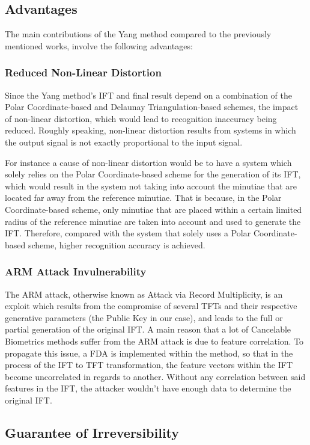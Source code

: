 \documentclass[fyp]{socreport}
\begin{document}
\subsection{Advantages}
The main contributions of the Yang method compared to the previously mentioned works, involve the following advantages:

\subsubsection{Reduced Non-Linear Distortion}
Since the Yang method's IFT and final result depend on a combination of the Polar Coordinate-based and Delaunay Triangulation-based schemes, the impact of non-linear distortion, which would lead to recognition inaccuracy being reduced. Roughly speaking, non-linear distortion results from systems in which the output signal is not exactly proportional to the input signal. 

For instance a cause of non-linear distortion would be to have a system which solely relies on the Polar Coordinate-based scheme for the generation of its IFT, which would result in the system not taking into account the minutiae that are located far away from the reference minutiae. That is because, in the Polar Coordinate-based scheme, only minutiae that are placed within a certain limited radius of the reference minutiae are taken into account and used to generate the IFT. Therefore, compared with the system that solely uses a Polar Coordinate-based scheme, higher recognition accuracy is achieved.

\subsubsection{ARM Attack Invulnerability}
The ARM attack, otherwise known as Attack via Record Multiplicity, is an exploit which results from the compromise of several TFTs and their respective generative parameters (the Public Key in our case), and leads to the full or partial generation of the original IFT. A main reason that a lot of Cancelable Biometrics methods suffer from the ARM attack is due to feature correlation. To propagate this issue, a FDA is implemented within the method, so that in the process of the IFT to TFT transformation, the feature vectors within the IFT become uncorrelated in regards to another. Without any correlation between said features in the IFT, the attacker wouldn't have enough data to determine the original IFT.

\subsection{Guarantee of Irreversibility}
\end{document}
